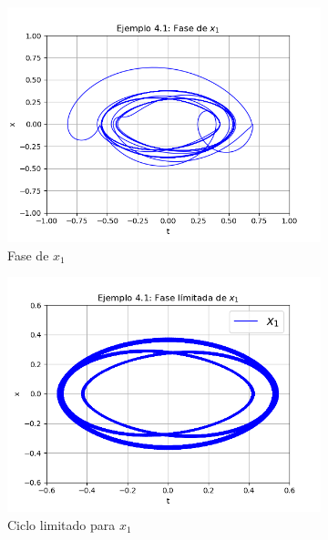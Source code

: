 \documentclass[a4paper]{article}
\begin{document}
\begin{center}
\begin{figure}[ht!]
\begin{subfigure}{0.6\textwidth}
  \centering
  \includegraphics[width=\linewidth]{ejemplo_4_1_4.png}
   \caption{Fase de $x_1$}
\end{subfigure}
\begin{subfigure}{0.6\textwidth}
  \centering
  \includegraphics[width=\linewidth]{ejemplo_4_2_1.png}
  \caption{Ciclo limitado para $x_1$}
\end{subfigure}
\begin{subfigure}{0.6\textwidth}
  \centering

\end{subfigure}
\end{figure}
\end{center}
\end{document}
